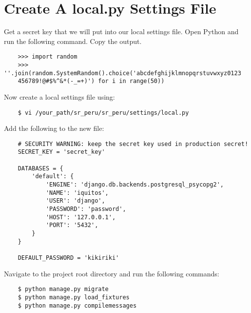 \documentclass{article}
\begin{document}
\section{Create A local.py Settings File}
Get a secret key that we will put into our local settings file. Open Python and run the following command. Copy the output.
\begin{verbatim}
    >>> import random
    >>> ''.join(random.SystemRandom().choice('abcdefghijklmnopqrstuvwxyz0123
    456789!@#$%^&*(-_=+)') for i in range(50))
\end{verbatim}
Now create a local settings file using:
\begin{verbatim}
    $ vi /your_path/sr_peru/sr_peru/settings/local.py
\end{verbatim}
Add the following to the new file:
\begin{verbatim}
    # SECURITY WARNING: keep the secret key used in production secret!
    SECRET_KEY = 'secret_key'
    
    DATABASES = {
        'default': {
            'ENGINE': 'django.db.backends.postgresql_psycopg2',
            'NAME': 'iquitos',
            'USER': 'django',
            'PASSWORD': 'password',
            'HOST': '127.0.0.1',
            'PORT': '5432',
        }
    }

    DEFAULT_PASSWORD = 'kikiriki'
\end{verbatim}
Navigate to the project root directory and run the following commands:
\begin{verbatim}
    $ python manage.py migrate
    $ python manage.py load_fixtures
    $ python manage.py compilemessages
\end{verbatim}
\end{document}
